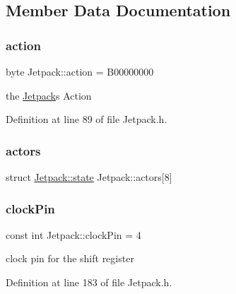 \subsection{Member Data Documentation}
\mbox{\label{class_jetpack_aca3142925a7b0834b34ae91d26af7765}} 
\subsubsection{\texorpdfstring{action}{action}}
{\footnotesize\ttfamily byte Jetpack\+::action = B00000000\hspace{0.3cm}{\ttfamily [private]}}

the \hyperlink{class_jetpack}{Jetpack}\textquotesingle{}s Action 

Definition at line 89 of file Jetpack.\+h.

\mbox{\label{class_jetpack_a7e16d2f97837f9712a2e6de1c50d99db}} 
\subsubsection{\texorpdfstring{actors}{actors}}
{\footnotesize\ttfamily struct \hyperlink{struct_jetpack_1_1state}{Jetpack\+::state} Jetpack\+::actors\mbox{[}8\mbox{]}\hspace{0.3cm}{\ttfamily [private]}}

\mbox{\label{class_jetpack_a58ebb991f358f3ae94e82148b0221b5a}} 
\subsubsection{\texorpdfstring{clock\+Pin}{clockPin}}
{\footnotesize\ttfamily const int Jetpack\+::clock\+Pin = 4\hspace{0.3cm}{\ttfamily [private]}}

clock pin for the shift register 

Definition at line 183 of file Jetpack.\+h.

\mbox{\label{class_jetpack_a3d669a56e93c71dd25f970d4ed7d0c00}} 
